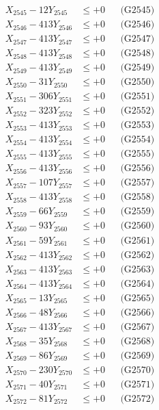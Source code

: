 \documentclass[a4paper,10pt]{article}
\begin{document}
{\begin{align}
X_{2545} - 12Y_{2545} &\leq +0 && \text{(G2545)} \\
X_{2546} - 413Y_{2546} &\leq +0 && \text{(G2546)} \\
X_{2547} - 413Y_{2547} &\leq +0 && \text{(G2547)} \\
X_{2548} - 413Y_{2548} &\leq +0 && \text{(G2548)} \\
X_{2549} - 413Y_{2549} &\leq +0 && \text{(G2549)} \\
X_{2550} - 31Y_{2550} &\leq +0 && \text{(G2550)} \\
\allowbreak
X_{2551} - 306Y_{2551} &\leq +0 && \text{(G2551)} \\
X_{2552} - 323Y_{2552} &\leq +0 && \text{(G2552)} \\
X_{2553} - 413Y_{2553} &\leq +0 && \text{(G2553)} \\
X_{2554} - 413Y_{2554} &\leq +0 && \text{(G2554)} \\
X_{2555} - 413Y_{2555} &\leq +0 && \text{(G2555)} \\
X_{2556} - 413Y_{2556} &\leq +0 && \text{(G2556)} \\
X_{2557} - 107Y_{2557} &\leq +0 && \text{(G2557)} \\
X_{2558} - 413Y_{2558} &\leq +0 && \text{(G2558)} \\
X_{2559} - 66Y_{2559} &\leq +0 && \text{(G2559)} \\
X_{2560} - 93Y_{2560} &\leq +0 && \text{(G2560)} \\
\allowbreak
X_{2561} - 59Y_{2561} &\leq +0 && \text{(G2561)} \\
X_{2562} - 413Y_{2562} &\leq +0 && \text{(G2562)} \\
X_{2563} - 413Y_{2563} &\leq +0 && \text{(G2563)} \\
X_{2564} - 413Y_{2564} &\leq +0 && \text{(G2564)} \\
X_{2565} - 13Y_{2565} &\leq +0 && \text{(G2565)} \\
X_{2566} - 48Y_{2566} &\leq +0 && \text{(G2566)} \\
X_{2567} - 413Y_{2567} &\leq +0 && \text{(G2567)} \\
X_{2568} - 35Y_{2568} &\leq +0 && \text{(G2568)} \\
X_{2569} - 86Y_{2569} &\leq +0 && \text{(G2569)} \\
X_{2570} - 230Y_{2570} &\leq +0 && \text{(G2570)} \\
\allowbreak
X_{2571} - 40Y_{2571} &\leq +0 && \text{(G2571)} \\
X_{2572} - 81Y_{2572} &\leq +0 && \text{(G2572)} \\

\end{align}}
\end{document}
